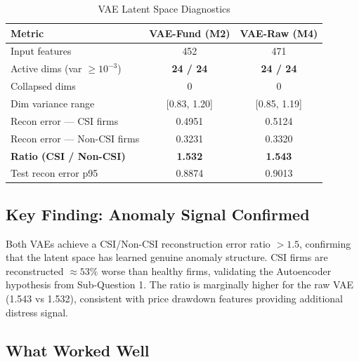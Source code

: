 \documentclass{report}\usepackage[]{graphicx}\usepackage[table]{xcolor}
\begin{document}
\begin{table}[H]
\centering
\caption{VAE Latent Space Diagnostics}
\begin{tabular}{lcc}
\toprule
\textbf{Metric} & \textbf{VAE-Fund (M2)} & \textbf{VAE-Raw (M4)} \\
\midrule
Input features & 452 & 471 \\
Active dims (var $\geq 10^{-3}$) & \textbf{24 / 24} & \textbf{24 / 24} \\
Collapsed dims & 0 & 0 \\
Dim variance range & {[}0.83, 1.20{]} & {[}0.85, 1.19{]} \\
Recon error — CSI firms & 0.4951 & 0.5124 \\
Recon error — Non-CSI firms & 0.3231 & 0.3320 \\
\textbf{Ratio (CSI / Non-CSI)} & \textbf{1.532} & \textbf{1.543} \\
Test recon error p95 & 0.8874 & 0.9013 \\
\bottomrule
\end{tabular}
\end{table}

\subsection{Key Finding: Anomaly Signal Confirmed}

Both VAEs achieve a CSI/Non-CSI reconstruction error ratio $> 1.5$, confirming that 
the latent space has learned genuine anomaly structure. CSI firms are reconstructed 
$\approx 53\%$ worse than healthy firms, validating the Autoencoder hypothesis 
from Sub-Question 1. The ratio is marginally higher for the raw VAE (1.543 vs 1.532), 
consistent with price drawdown features providing additional distress signal.

\subsection{What Worked Well}
\end{document}
